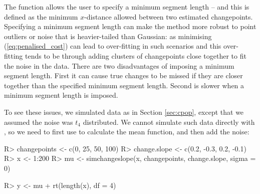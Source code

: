 \documentclass[nojss]{jss}
\begin{document}
The  function allows the user to specify a minimum segment length -- and this is defined as the minimum $x$-distance allowed between two estimated changepoints. Specifying a minimum segment length can make the method more robust to point outliers or noise that is heavier-tailed than Gaussian: as minimising (\ref{eq:penalised_cost}) can lead to over-fitting in such scenarios and this over-fitting tends to be through adding clusters of changepoints close together to fit the noise in the data. There are two disadvantages of imposing a minimum segment length. First it can cause true changes to be missed if they are closer together than the specified minimum segment length. Second  is slower when a minimum segment length is imposed.

To see these issues, we simulated data as in Section \ref{sec:cpop}, except that we assumed the noise was $t_4$ distributed. We cannot simulate such data directly with , so we need to first use  to calculate the mean function, and then add the noise:

\begin{CodeChunk}
\begin{CodeInput}
R> changepoints <- c(0, 25, 50, 100)
R> change.slope <- c(0.2, -0.3, 0.2, -0.1)
R> x <- 1:200
R> mu <- simchangeslope(x, changepoints, change.slope, sigma = 0)

R> y <- mu + rt(length(x), df = 4)
\end{CodeInput}
\end{CodeChunk}
\end{document}
